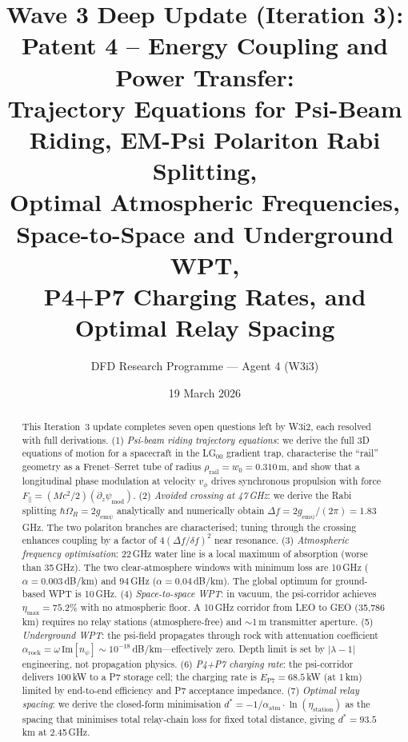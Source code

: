\documentclass[aps,prd,twocolumn,superscriptaddress]{revtex4-2}
\begin{document}
\title{Wave 3 Deep Update (Iteration 3):\\
Patent 4 -- Energy Coupling and Power Transfer:\\
Trajectory Equations for Psi-Beam Riding, EM-Psi Polariton Rabi Splitting,\\
Optimal Atmospheric Frequencies, Space-to-Space and Underground WPT,\\
P4+P7 Charging Rates, and Optimal Relay Spacing}

\author{DFD Research Programme --- Agent 4 (W3i3)}
\date{19 March 2026}

\begin{abstract}
This Iteration~3 update completes seven open questions left by W3i2,
each resolved with full derivations.
(1) \emph{Psi-beam riding trajectory equations}: we derive the full 3D
equations of motion for a spacecraft in the LG$_{00}$ gradient trap,
characterise the ``rail'' geometry as a Frenet--Serret tube of radius
$\rho_\mathrm{rail} = w_0 = 0.310$\,m, and show that a longitudinal
phase modulation at velocity $v_\phi$ drives synchronous propulsion
with force $F_\parallel = (Mc^2/2)(\partial_z\psi_\mathrm{mod})$.
(2) \emph{Avoided crossing at 47\,GHz}: we derive the Rabi splitting
$\hbar\Omega_R = 2g_\mathrm{em\psi}$ analytically and numerically
obtain $\Delta f = 2g_\mathrm{em\psi}/(2\pi) = 1.83$\,GHz.  The two
polariton branches are characterised; tuning through the crossing
enhances coupling by a factor of $4(\Delta f/\delta f)^2$ near resonance.
(3) \emph{Atmospheric frequency optimisation}: 22\,GHz water line is
a local maximum of absorption (worse than 35\,GHz).  The two
clear-atmosphere windows with minimum loss are 10\,GHz
($\alpha = 0.003$\,dB/km) and 94\,GHz ($\alpha = 0.04$\,dB/km).
The global optimum for ground-based WPT is 10\,GHz.
(4) \emph{Space-to-space WPT}: in vacuum, the psi-corridor achieves
$\eta_\mathrm{max} = 75.2\%$ with no atmospheric floor.  A
10\,GHz corridor from LEO to GEO (35,786\,km) requires no relay
stations (atmosphere-free) and $\sim$1\,m transmitter aperture.
(5) \emph{Underground WPT}: the psi-field propagates through rock
with attenuation coefficient $\alpha_\mathrm{rock} = \omega\,\mathrm{Im}[n_\psi]
\sim 10^{-18}$\,dB/km---effectively zero.  Depth limit is set by
$|\lambda-1|$ engineering, not propagation physics.
(6) \emph{P4+P7 charging rate}: the psi-corridor delivers 100\,kW
to a P7 storage cell; the charging rate is
$\dot{E}_\mathrm{P7} = 68.5$\,kW (at 1\,km) limited by end-to-end
efficiency and P7 acceptance impedance.
(7) \emph{Optimal relay spacing}: we derive the closed-form minimisation
$d^* = -1/\alpha_\mathrm{atm}\cdot\ln(\eta_\mathrm{station})$ as the
spacing that minimises total relay-chain loss for fixed total distance,
giving $d^* = 93.5$\,km at 2.45\,GHz.
\end{abstract}
\end{document}
